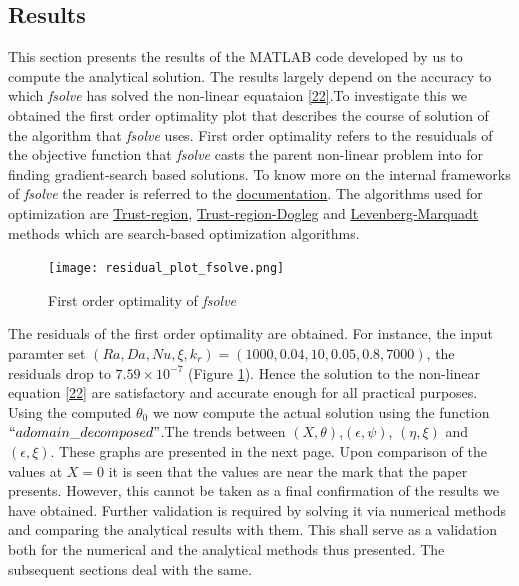 \documentclass[12pt]{article}
\begin{document}
\subsection{Results}
This section presents the results of the MATLAB code developed by us to compute the analytical solution. The results largely depend on the accuracy to which \emph{fsolve} has solved the non-linear equataion \eqref{22}.To investigate this we obtained the first order optimality plot that describes the course of solution of the algorithm that \emph{fsolve} uses. First order optimality refers to the resuiduals of the objective function that \emph{fsolve} casts the parent non-linear problem into for finding gradient-search based solutions. To know more on the internal frameworks of \emph{fsolve} the reader is referred to the  \href{https://www.mathworks.com/help/optim/ug/fsolve.html#butbmfz-5}{documentation}. The algorithms used for optimization are \href{https://www.mathworks.com/help/optim/ug/equation-solving-algorithms.html#brnpdsm}{Trust-region}, \href{https://www.mathworks.com/help/optim/ug/equation-solving-algorithms.html#f51887}{Trust-region-Dogleg} and \href{https://www.mathworks.com/help/optim/ug/equation-solving-algorithms.html#f51887}{Levenberg-Marquadt} methods which are search-based optimization algorithms.   
\begin{figure}[h]
    \centering
    \texttt{[image: residual\_plot\_fsolve.png]}
    \caption{First order optimality of \emph{fsolve}}
    \label{fig:3}
\end{figure}
The residuals of the first order optimality are obtained. For instance, the input paramter set $(Ra, Da, Nu, \xi, k_r) = (1000, 0.04, 10, 0.05, 0.8, 7000)$, the residuals drop to $7.59\times 10^{-7}$ (Figure \ref{fig:3}). Hence the solution to the non-linear equation \eqref{22} are satisfactory and accurate enough for all practical purposes. Using the computed $\theta_0$ we now compute the actual solution using the function \href{https://rsuryanarayan.github.io/CFD_Documentation/}{$``adomain\_decomposed"$}.The trends between $(X,\theta)$,$(\epsilon,\psi)$, $(\eta,\xi)$ and $(\epsilon,\xi)$. These graphs are presented in the next page. Upon comparison of the values at $X=0$ it is seen that the values are near the mark that the paper presents. However, this cannot be taken as a final confirmation of the results we have obtained. Further validation is required by solving it via numerical methods and comparing the analytical results with them. This shall serve as a validation both for the numerical and the analytical methods thus presented. The subsequent sections deal with the same. 
\end{document}

